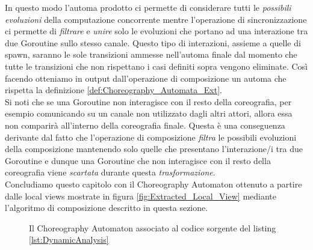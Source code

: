 In questo modo l'automa prodotto ci permette di considerare tutti le \emph{possibili evoluzioni} della computazione concorrente mentre l'operazione di sincronizzazione ci permette di \emph{filtrare} e \emph{unire} solo le evoluzioni che portano ad una interazione tra due Goroutine sullo stesso canale. Questo tipo di interazioni, assieme a quelle di spawn, saranno le sole transizioni ammesse nell'automa finale dal momento che tutte le transizioni che non rispettano i casi definiti sopra vengono eliminate. Così facendo otteniamo in output dall'operazione di composizione un automa che rispetta la definizione \ref{def:Choreography_Automata_Ext}.\bigskip \\
Si noti che se una Goroutine non interagisce con il resto della coreografia, per esempio comunicando su un canale non utilizzato dagli altri attori, allora essa non comparirà all'interno della coreografia finale. Questa è una conseguenza derivante dal fatto che l'operazione di composizione \emph{filtra} le possibili evoluzioni della composizione mantenendo solo quelle che presentano l'interazione/i tra due Goroutine e dunque una Goroutine che non interagisce con il resto della coreografia viene \emph{scartata} durante questa \emph{trasformazione}.\bigskip \\
Concludiamo questo capitolo con il Choreography Automaton ottenuto a partire dalle local views mostrate in figura \ref{fig:Extracted_Local_View} mediante l'algoritmo di composizione descritto in questa sezione.
\begin{figure}[h!]
    \centering
    \caption{Il Choreography Automaton associato al codice sorgente del listing \ref{lst:DynamicAnalysis}}
\end{figure}